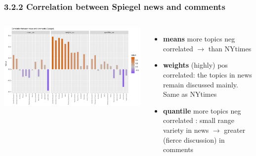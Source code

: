 \documentclass{tum-presentation}
\begin{document}
\begin{frame}
  \frametitle{3.2.2 Correlation between Spiegel news and comments}

  \begin{columns}
    \begin{minipage}[c]{\linewidth}
        \centering
        \includegraphics[width=0.95\linewidth]{figures/cor_bar_Spiegel.pdf}
    \end{minipage}
    \begin{minipage}[c]{\linewidth}
    \begin{itemize}
      \item \textbf{means} more topics neg correlated  \smiley{} $\rightarrow$  \frownie{} than NYtimes
      \item \textbf{weights} (highly) pos correlated: the topics in news remain discussed mainly. Same as NYtimes
      \item \textbf{quantile} more topics neg correlated : small range variety in news $\rightarrow$ greater (fierce discussion) in comments
    \end{itemize}
  \end{minipage}
\end{columns}
\end{frame}
\end{document}
